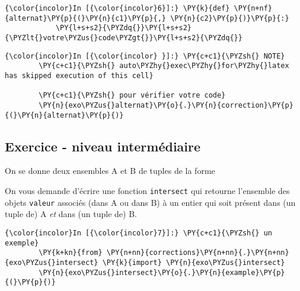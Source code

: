     \begin{Verbatim}[commandchars=\\\{\},frame=single,framerule=0.3mm,rulecolor=\color{cellframecolor}]
{\color{incolor}In [{\color{incolor}6}]:} \PY{k}{def} \PY{n+nf}{alternat}\PY{p}{(}\PY{n}{c1}\PY{p}{,} \PY{n}{c2}\PY{p}{)}\PY{p}{:}
            \PY{l+s+s2}{\PYZdq{}}\PY{l+s+s2}{\PYZlt{}votre\PYZus{}code\PYZgt{}}\PY{l+s+s2}{\PYZdq{}}
\end{Verbatim}


    \begin{Verbatim}[commandchars=\\\{\},frame=single,framerule=0.3mm,rulecolor=\color{cellframecolor}]
{\color{incolor}In [{\color{incolor} }]:} \PY{c+c1}{\PYZsh{} NOTE}
        \PY{c+c1}{\PYZsh{} auto\PYZhy{}exec\PYZhy{}for\PYZhy{}latex has skipped execution of this cell}
        
        \PY{c+c1}{\PYZsh{} pour vérifier votre code}
        \PY{n}{exo\PYZus{}alternat}\PY{o}{.}\PY{n}{correction}\PY{p}{(}\PY{n}{alternat}\PY{p}{)}
\end{Verbatim}


    \hypertarget{exercice---niveau-intermuxe9diaire}{%
\subsection{Exercice - niveau
intermédiaire}\label{exercice---niveau-intermuxe9diaire}}

    On se donne deux ensembles A et B de tuples de la forme

\begin{Shaded}
\begin{Highlighting}[frame=lines,framerule=0.6mm,rulecolor=\color{asisframecolor}]
\end{Highlighting}
\end{Shaded}

On vous demande d'écrire une fonction \texttt{intersect} qui retourne
l'ensemble des objets \texttt{valeur} associés (dans A ou dans B) à un
entier qui soit présent dans (un tuple de) A \emph{et} dans (un tuple
de) B.

    \begin{Verbatim}[commandchars=\\\{\},frame=single,framerule=0.3mm,rulecolor=\color{cellframecolor}]
{\color{incolor}In [{\color{incolor}7}]:} \PY{c+c1}{\PYZsh{} un exemple}
        \PY{k+kn}{from} \PY{n+nn}{corrections}\PY{n+nn}{.}\PY{n+nn}{exo\PYZus{}intersect} \PY{k}{import} \PY{n}{exo\PYZus{}intersect}
        \PY{n}{exo\PYZus{}intersect}\PY{o}{.}\PY{n}{example}\PY{p}{(}\PY{p}{)}
\end{Verbatim}


